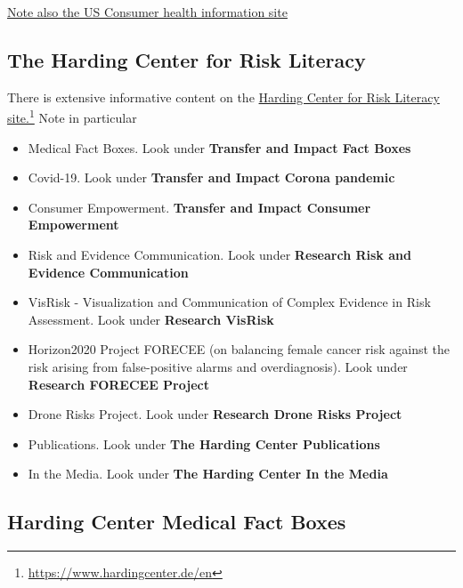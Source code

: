 \documentclass[
  10pt,
  b5paper]{book}
\providecommand{\tightlist}{%
  \setlength{\itemsep}{0pt}\setlength{\parskip}{0pt}}
\begin{document}
\href{https://medlineplus.gov/}{Note also the US Consumer health information
site}

\hypertarget{the-harding-center-for-risk-literacy}{%
\subsection*{The Harding Center for Risk Literacy}\label{the-harding-center-for-risk-literacy}}

There is extensive informative content on the \href{https://www.hardingcenter.de/en}{Harding Center for Risk
Literacy site.}\footnote{\url{https://www.hardingcenter.de/en}} Note in
particular

\begin{itemize}
\tightlist
\item
  Medical Fact Boxes. Look under \textbf{Transfer and Impact \textbar{} Fact Boxes}
\item
  Covid-19. Look under \textbf{Transfer and Impact \textbar{} Corona pandemic}
\item
  Consumer Empowerment. \textbf{Transfer and Impact \textbar{} Consumer
  Empowerment}
\item
  Risk and Evidence Communication. Look under \textbf{Research \textbar{} Risk and
  Evidence Communication}
\item
  VisRisk - Visualization and Communication of Complex Evidence in
  Risk Assessment. Look under \textbf{Research \textbar{} VisRisk}
\item
  Horizon2020 Project FORECEE (on balancing female cancer risk against
  the risk arising from false-positive alarms and overdiagnosis). Look
  under \textbf{Research \textbar{} FORECEE Project}
\item
  Drone Risks Project. Look under \textbf{Research \textbar{} Drone Risks Project}
\item
  Publications. Look under \textbf{The Harding Center \textbar{} Publications}
\item
  In the Media. Look under \textbf{The Harding Center \textbar{} In the Media}
\end{itemize}

\hypertarget{harding-center-medical-fact-boxes}{%
\subsection*{Harding Center Medical Fact Boxes}\label{harding-center-medical-fact-boxes}}
\end{document}
